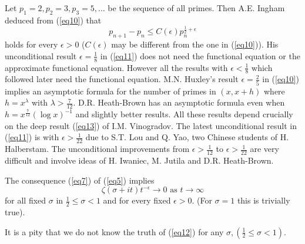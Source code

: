 \medskip
{} Let $p_1 = 2, p_2 = 3, p_3 = 5, \ldots $ be the sequence of all primes. Then A.E. Ingham deduced from (\ref{eq10}) that
\begin{equation*}
p_{n+1} - p_n \leq C (\epsilon)p^{\frac{1}{2} + \epsilon}_n \tag{11}\label{eq11}
\end{equation*}
holds for every $\epsilon > 0 $ ($C(\epsilon)$ may be different from the one in (\ref{eq10})). His unconditional result $\epsilon = \frac{1}{8}$ in (\ref{eq11}) does not need the functional equation or the approximate functional equation. However all the results with $\epsilon < \frac{1}{8}$ which followed later need the functional equation. M.N. Huxley's result $\epsilon = \frac{2}{5}$ in (\ref{eq10}) implies an asymptotic formula for the number of primes in $(x,x + h)$ where $h = x^\lambda$ with $\lambda > \frac{7}{12}$. D.R. Heath-Brown has an asymptotic formula even when $h = x^{\frac{7}{12}} (\log x)^{-1}$ and slightly better results. All these results depend crucially on the deep result (\ref{eq13}) of I.M. Vinogradov. The latest unconditional result in (\ref{eq11}) is with $\epsilon > \frac{1}{22}$ due to S.T. Lou and Q. Yao, two Chinese students of H. Halberstam. The unconditional improvements from $\epsilon > \frac{1}{12}$ to $\epsilon > \frac{1}{22}$ are very difficult and involve ideas of H. Iwaniec, M. Jutila and D.R. Heath-Brown.

\medskip
{} The consequence (\ref{eq7}) of (\ref{eq5}) implies
\begin{equation*}
\zeta(\sigma + it) t^{-\epsilon} \to 0 \text{ as } t \to \infty \tag{12}\label{eq12}
\end{equation*}
for all fixed $\sigma$ in $\frac{1}{2} \leq \sigma < 1$ and for every fixed $\epsilon >0$. (For $\sigma =1$ this is trivially true).

\setcounter{remark}{0}
\begin{remark}%
It is a pity that we do not know the truth of (\ref{eq12}) for any $\sigma, \left(\frac{1}{2} \leq \sigma < 1 \right)$.
\end{remark}

